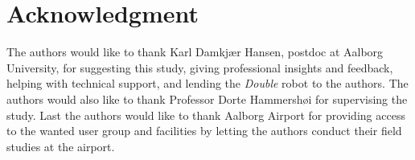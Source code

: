 \section*{Acknowledgment}
\label{Acknowledgment}
%
The authors would like to thank Karl Damkjær Hansen, postdoc at Aalborg University, for suggesting this study, giving professional insights and feedback, helping with technical support, and lending the \textit{Double} robot to the authors.
The authors would also like to thank Professor Dorte Hammershøi for supervising the study. 
Last the authors would like to thank Aalborg Airport for providing access to the wanted user group and facilities by letting the authors conduct their field studies at the airport. 